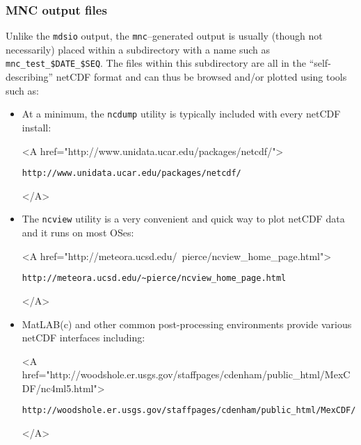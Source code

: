 \subsubsection{MNC output files}

Unlike the \texttt{mdsio} output, the \texttt{mnc}--generated output
is usually (though not necessarily) placed within a subdirectory with
a name such as \texttt{mnc\_test\_\${DATE}\_\${SEQ}}.  The files
within this subdirectory are all in the ``self-describing'' netCDF
format and can thus be browsed and/or plotted using tools such as:
\begin{itemize}
\item At a minimum, the \texttt{ncdump} utility is typically included
  with every netCDF install:
  \begin{rawhtml} <A href="http://www.unidata.ucar.edu/packages/netcdf/"> \end{rawhtml}
\begin{verbatim}
http://www.unidata.ucar.edu/packages/netcdf/
\end{verbatim}
  \begin{rawhtml} </A> \end{rawhtml}

\item The \texttt{ncview} utility is a very convenient and quick way
  to plot netCDF data and it runs on most OSes:
  \begin{rawhtml} <A href="http://meteora.ucsd.edu/~pierce/ncview_home_page.html"> \end{rawhtml}
\begin{verbatim}
http://meteora.ucsd.edu/~pierce/ncview_home_page.html
\end{verbatim}
  \begin{rawhtml} </A> \end{rawhtml}
  
\item MatLAB(c) and other common post-processing environments provide
  various netCDF interfaces including:
  \begin{rawhtml} <A href="http://woodshole.er.usgs.gov/staffpages/cdenham/public_html/MexCDF/nc4ml5.html"> \end{rawhtml}
\begin{verbatim}
http://woodshole.er.usgs.gov/staffpages/cdenham/public_html/MexCDF/nc4ml5.html
\end{verbatim}
  \begin{rawhtml} </A> \end{rawhtml}

\end{itemize}


